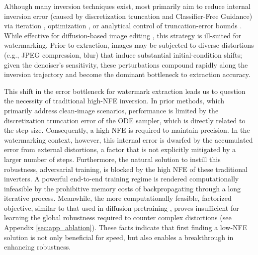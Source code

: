 \documentclass{article}
\begin{document}
Although many inversion techniques \citep{nti2023, exactdpm2024, edict2023} exist, most primarily aim to reduce internal inversion error (caused by discretization truncation and Classifier-Free Guidance) via iteration \citep{aidi2023, renoise2024, lightning2023}, optimization \citep{exactdpm2024, spdinv2024, nti2023}, or analytical control of truncation-error bounds \citep{edict2023, bdia2024, belm2024}. While effective for diffusion-based image editing \citep{ptp2022}, this strategy is ill-suited for watermarking. Prior to extraction, images may be subjected to diverse distortions (e.g., JPEG compression, blur) that induce substantial initial-condition shifts; given the denoiser's sensitivity, these perturbations compound rapidly along the inversion trajectory and become the dominant bottleneck to extraction accuracy. 


This shift in the error bottleneck for watermark extraction leads us to question the necessity of traditional high-NFE inversion. In prior methods, which primarily address clean-image scenarios, performance is limited by the discretization truncation error of the ODE sampler, which is directly related to the step size. Consequently, a high NFE is required to maintain precision. In the watermarking context, however, this internal error is dwarfed by the accumulated error from external distortions, a factor that is not explicitly mitigated by a larger number of steps.
Furthermore, the natural solution to instill this robustness, adversarial training, is blocked by the high NFE of these traditional inverters. A powerful end-to-end training regime is rendered computationally infeasible by the prohibitive memory costs of backpropagating through a long iterative process. Meanwhile, the more computationally feasible, factorized objective, similar to that used in diffusion pretraining \citep{ddpm_2020}, proves insufficient for learning the global robustness required to counter complex distortions (see Appendix \ref{sec:app_ablation}). These facts indicate that first finding a low-NFE solution is not only beneficial for speed, but also enables a breakthrough in enhancing robustness.

\end{document}
